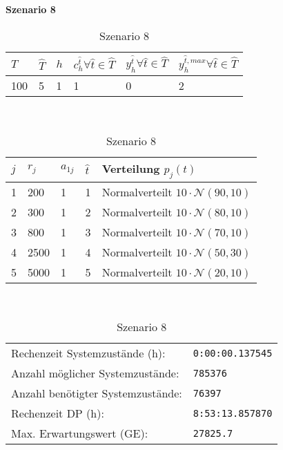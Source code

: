 \textbf{Szenario 8}

\begin{table}[h!]
\renewcommand{\arraystretch}{1.5}
  \begin{center}
    \caption{Szenario 8}  \label{S8}
    \vspace*{3mm}
    \begin{tabular}{l l l l l l}   %
    $T$ & $\hat T$  & $h$ & $c_h^{\hat t}\forall \hat{t}\in{\hat T}$ & $y_h^{\hat t}\forall \hat{t}\in{\hat T}$  & $y_h^{{\hat t},max}\forall \hat{t}\in{\hat T}$  \\  \hline
100 & 5 & 1 & 1 & 0 & 2  \\ \hline
    \end{tabular} \\[3mm]
        \begin{tabular}{p{1cm} p{1cm} p{1cm}  p{1cm} p{6cm}}   %
    $j$ & $r_j$  & $a_{1j}$ & $\hat t$ & Verteilung $p_j(t)$ \\  \hline
1 & 200 & 1 & 1 & Normalverteilt $10\cdot\mathcal{N}(90, 10)$   \\
2 & 300 & 1 & 2 & Normalverteilt $10\cdot\mathcal{N}(80, 10)$  \\
3 & 800 & 1 & 3 & Normalverteilt $10\cdot\mathcal{N}(70, 10)$  \\
4 & 2500 & 1 & 4 & Normalverteilt $10\cdot\mathcal{N}(50, 30)$  \\
5 & 5000 & 1 & 5 & Normalverteilt $10\cdot\mathcal{N}(20, 10)$ \\
\hline
    \end{tabular} \\[3mm]
     \begin{tabular}{p{7cm}p{5cm}} \hline
     Rechenzeit Systemzustände (h): & \texttt{0:00:00.137545} \\
     Anzahl möglicher Systemzustände: & \texttt{785376} \\
     Anzahl benötigter Systemzustände: & \texttt{76397} \\ 
     Rechenzeit DP (h): & \texttt{8:53:13.857870} \\ 
          Max. Erwartungswert (GE): & \texttt{27825.7} \\ \hline
         \end{tabular} \\[3mm]
  \end{center}
\end{table}

